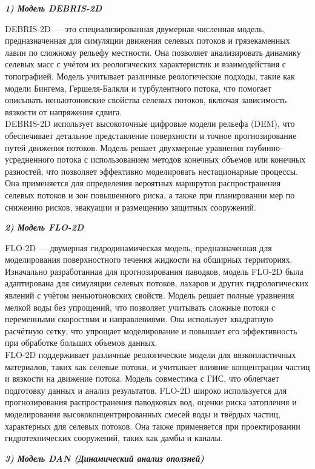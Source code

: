 \begin{multicols}{2}
\emph{{\bfseries 1) Модель DEBRIS-2D}}

DEBRIS-2D --- это специализированная двумерная численная модель,
предназначенная для симуляции движения селевых потоков и грязекаменных
лавин по сложному рельефу местности. Она позволяет анализировать
динамику селевых масс с учётом их реологических характеристик и
взаимодействия с топографией. Модель учитывает различные реологические
подходы, такие как модели Бингема, Гершеля-Балкли и турбулентного
потока, что помогает описывать неньютоновские свойства селевых потоков,
включая зависимость вязкости от напряжения сдвига.\\
DEBRIS-2D использует высокоточные цифровые модели рельефа (DEM), что
обеспечивает детальное представление поверхности и точное
прогнозирование путей движения потоков. Модель решает двухмерные
уравнения глубинно-усредненного потока с использованием методов конечных
объемов или конечных разностей, что позволяет эффективно моделировать
нестационарные процессы. Она применяется для определения вероятных
маршрутов распространения селевых потоков и зон повышенного риска, а
также при планировании мер по снижению рисков, эвакуации и размещению
защитных сооружений.

\emph{{\bfseries 2) Модель FLO-2D}}

FLO-2D --- двумерная гидродинамическая модель, предназначенная для
моделирования поверхностного течения жидкости на обширных территориях.
Изначально разработанная для прогнозирования паводков, модель FLO-2D
была адаптирована для симуляции селевых потоков, лахаров и других
гидрологических явлений с учётом неньютоновских свойств. Модель решает
полные уравнения мелкой воды без упрощений, что позволяет учитывать
сложные потоки с переменными скоростями и направлениями. Она использует
квадратную расчётную сетку, что упрощает моделирование и повышает его
эффективность при обработке больших объемов данных.\\
FLO-2D поддерживает различные реологические модели для вязкопластичных
материалов, таких как селевые потоки, и учитывает влияние концентрации
частиц и вязкости на движение потока. Модель совместима с ГИС, что
облегчает подготовку данных и анализ результатов. FLO-2D широко
используется для прогнозирования распространения паводковых вод, оценки
риска затопления и моделирования высококонцентрированных смесей воды и
твёрдых частиц, характерных для селевых потоков. Она также применяется
при проектировании гидротехнических сооружений, таких как дамбы и
каналы.

\emph{{\bfseries 3) Модель DAN (Динамический анализ оползней)}}


\end{multicols}
